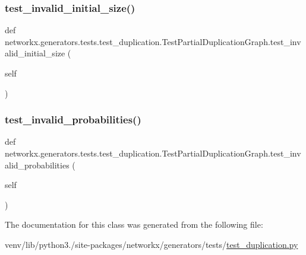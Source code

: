 \subsubsection{\texorpdfstring{test\+\_\+invalid\+\_\+initial\+\_\+size()}{test\_invalid\_initial\_size()}}
{\footnotesize\ttfamily def networkx.\+generators.\+tests.\+test\+\_\+duplication.\+Test\+Partial\+Duplication\+Graph.\+test\+\_\+invalid\+\_\+initial\+\_\+size (\begin{DoxyParamCaption}\item[{}]{self }\end{DoxyParamCaption})}

\mbox{\label{classnetworkx_1_1generators_1_1tests_1_1test__duplication_1_1TestPartialDuplicationGraph_ae15bf23920be330b67ebe17a7c047055}} 
\subsubsection{\texorpdfstring{test\+\_\+invalid\+\_\+probabilities()}{test\_invalid\_probabilities()}}
{\footnotesize\ttfamily def networkx.\+generators.\+tests.\+test\+\_\+duplication.\+Test\+Partial\+Duplication\+Graph.\+test\+\_\+invalid\+\_\+probabilities (\begin{DoxyParamCaption}\item[{}]{self }\end{DoxyParamCaption})}



The documentation for this class was generated from the following file\+:\begin{DoxyCompactItemize}
\item 
venv/lib/python3./site-\/packages/networkx/generators/tests/\hyperlink{test__duplication_8py}{test\+\_\+duplication.\+py}\end{DoxyCompactItemize}
